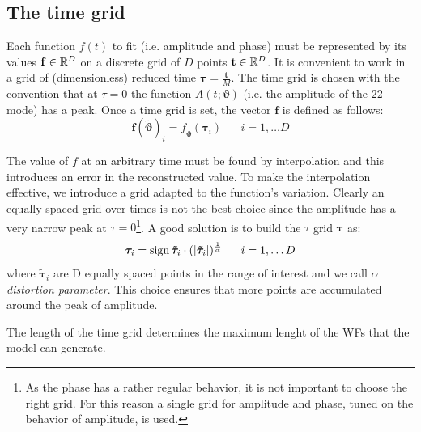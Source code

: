 %
\subsection{The time grid}
Each function $f(t)$ to fit (i.e. amplitude and phase) must be represented by its values $\mathbf{f} \in \mathbb{R}^D$ on a discrete grid of $D$ points $\mathbf{t} \in \mathbb{R}^D$.
It is convenient to work in a grid of (dimensionless) reduced time $\boldsymbol{\tau} = \frac{\mathbf{t}}{M}$.
The time grid is chosen with the convention that at $\tau=0$ the function $A(t;\boldsymbol{\vartheta})$ (i.e. the amplitude of the ${22}$ mode) has a peak.
Once a time grid is set, the vector $\mathbf{f}$ is defined as follows:
\begin{equation}
	\mathbf{f}({\tilde{\boldsymbol{\vartheta}}})_i = f_{{\tilde{\boldsymbol{\vartheta}}}}(\boldsymbol{\tau}_i) \;\;\;\;\;\; i = 1, \ldots D
\end{equation}
\par
The value of $f$ at an arbitrary time must be found by interpolation and this introduces an error in the reconstructed value.
To make the interpolation effective, we introduce a grid adapted to the
  function's variation.
Clearly an equally spaced grid over times is not the best choice since the amplitude has a very narrow peak at $\tau=0$\footnote{As the phase has a rather regular behavior, it is not important to choose the right grid. For this reason a single grid for amplitude and phase, tuned on the behavior of amplitude, is used.}.
A good solution is to build the $\tau$ grid ${\boldsymbol{\tau}}$ as:
\begin{equation} \label{eq:tau_grid}
	{\boldsymbol{\tau}}_i = \operatorname{sign}{\boldsymbol{\tilde{\tau}}_i} \cdot (|\boldsymbol{\tilde{\tau}}_i|)^{\frac{1}{\alpha}} \;\;\;\;\;\; i = 1, \ldots D
\end{equation}
where $\boldsymbol{\tilde{\tau}}_i$ are D equally spaced points in the range of interest and we call $\alpha$ \textit{distortion parameter}.
This choice ensures that more points are accumulated around the peak of amplitude.
\par
The length of the time grid determines the maximum lenght of the WFs that the model can generate.
